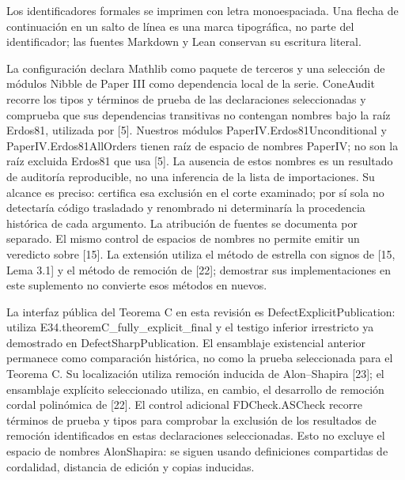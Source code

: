 \documentclass[spanish,11pt,a4paper]{article}
\begin{document}
Los identificadores formales se imprimen con letra monoespaciada. Una flecha de continuación en un salto de línea es una marca tipográfica, no parte del identificador; las fuentes Markdown y Lean conservan su escritura literal.

La configuración declara Mathlib como paquete de terceros y una selección de módulos {\ttfamily\small Nibble} de Paper III como dependencia local de la serie. {\ttfamily\small ConeAudit} recorre los tipos y términos de prueba de las declaraciones seleccionadas y comprueba que sus dependencias transitivas no contengan nombres bajo la raíz {\ttfamily\small Erdos81}, utilizada por {[}5{]}. Nuestros módulos {\ttfamily\small PaperIV.\discretionary{\hbox{\ensuremath{\hookrightarrow}}}{}{}Erdos81Uncon\discretionary{\hbox{\ensuremath{\hookrightarrow}}}{}{}ditional} y {\ttfamily\small PaperIV.\discretionary{\hbox{\ensuremath{\hookrightarrow}}}{}{}Erdos81AllOr\discretionary{\hbox{\ensuremath{\hookrightarrow}}}{}{}ders} tienen raíz de espacio de nombres PaperIV; no son la raíz excluida Erdos81 que usa {[}5{]}. La ausencia de estos nombres es un resultado de auditoría reproducible, no una inferencia de la lista de importaciones. Su alcance es preciso: certifica esa exclusión en el corte examinado; por sí sola no detectaría código trasladado y renombrado ni determinaría la procedencia histórica de cada argumento. La atribución de fuentes se documenta por separado. El mismo control de espacios de nombres no permite emitir un veredicto sobre {[}15{]}. La extensión utiliza el método de estrella con signos de {[}15, Lema 3.1{]} y el método de remoción de {[}22{]}; demostrar sus implementaciones en este suplemento no convierte esos métodos en nuevos.

La interfaz pública del Teorema C en esta revisión es DefectExplicitPublication: utiliza {\ttfamily\small E34.\discretionary{\hbox{\ensuremath{\hookrightarrow}}}{}{}theoremC\_\discretionary{\hbox{\ensuremath{\hookrightarrow}}}{}{}fully\_\discretionary{\hbox{\ensuremath{\hookrightarrow}}}{}{}explicit\_\discretionary{\hbox{\ensuremath{\hookrightarrow}}}{}{}final} y el testigo inferior irrestricto ya demostrado en DefectSharpPublication. El ensamblaje existencial anterior permanece como comparación histórica, no como la prueba seleccionada para el Teorema C. Su localización utiliza remoción inducida de Alon--Shapira {[}23{]}; el ensamblaje explícito seleccionado utiliza, en cambio, el desarrollo de remoción cordal polinómica de {[}22{]}. El control adicional FDCheck.ASCheck recorre términos de prueba y tipos para comprobar la exclusión de los resultados de remoción identificados en estas declaraciones seleccionadas. Esto no excluye el espacio de nombres AlonShapira: se siguen usando definiciones compartidas de cordalidad, distancia de edición y copias inducidas.
\end{document}
